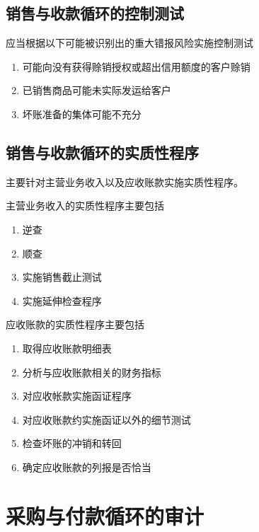 \documentclass[UTF8,12pt]{ctexart}
\numberwithin{equation}{section} %
\numberwithin{figure}{section}
\numberwithin{table}{section}
\begin{document}
	\subsection{销售与收款循环的控制测试}应当根据以下可能被识别出的重大错报风险实施控制测试
	\begin{enumerate}
		\item 可能向没有获得赊销授权或超出信用额度的客户赊销
		
		\item 已销售商品可能未实际发运给客户
		
		\item 坏账准备的集体可能不充分
	\end{enumerate}
	
	\subsection{销售与收款循环的实质性程序}
	主要针对主营业务收入以及应收账款实施实质性程序。
	
	主营业务收入的实质性程序主要包括
	\begin{enumerate}
		\item 逆查
		
		\item 顺查
		
		\item 实施销售截止测试
		
		\item 实施延伸检查程序
	\end{enumerate}
	
	应收账款的实质性程序主要包括
	\begin{enumerate}
		\item 取得应收账款明细表
		
		\item 分析与应收账款相关的财务指标
		
		\item 对应收帐款实施函证程序
		
		\item 对应收账款约实施函证以外的细节测试
		
		\item 检查坏账的冲销和转回
		
		\item 确定应收账款的列报是否恰当
	\end{enumerate}
	
	\newpage
	\section{采购与付款循环的审计}
\end{document}
